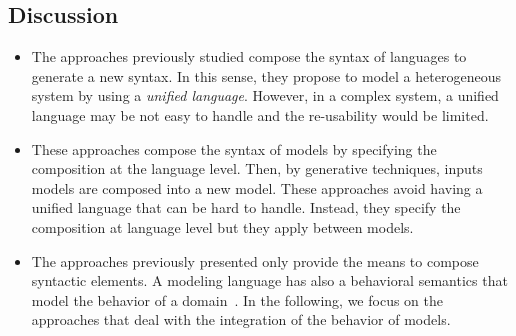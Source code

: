  \subsection{Discussion}
		 \begin{itemize}
			 	\item The approaches previously studied compose the syntax of languages to generate a new syntax. In this sense, they propose to model a heterogeneous system by using a \emph{unified language}. However, in a complex system, a unified language may be not easy to handle and the re-usability would be limited. 
			 	
			 	\item These approaches compose the syntax of models by specifying the composition at the language level. Then, by generative techniques, inputs models are composed into a new model. These approaches avoid having a unified language that can be hard to handle. Instead, they specify the composition at language level but they apply between models. 
			 	\item The approaches previously presented only provide the means to compose syntactic elements. A modeling language has also a behavioral semantics that model the behavior of a domain~\cite{?,?}. In the following, we focus on the approaches that deal with the integration of the behavior of models.  
		 \end{itemize}